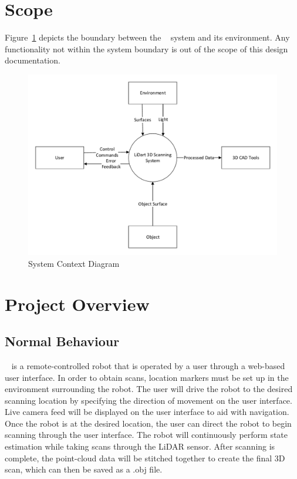 \documentclass[12pt, titlepage]{article}
\begin{document}

\section{Scope}
\label{sec_Scope}


Figure~\ref{Fig_SystemContext} depicts the boundary between the \progname~ system and its environment. Any functionality not within the system boundary is out of the scope of this design documentation.

\begin{figure}[H]
\begin{center}
 \includegraphics[width=1\textwidth]{Figures/Context Diagram.pdf}
\caption{System Context Diagram}
\label{Fig_SystemContext} 
\end{center}
\end{figure}

\section{Project Overview}
\label{sec_ProjOverview}

\subsection{Normal Behaviour}

\progname~ is a remote-controlled robot that is operated by a user through a web-based user interface. In order to obtain scans, location markers must be set up in the environment surrounding the robot. The user will drive the robot to the desired scanning location by specifying the direction of movement on the user interface. Live camera feed will be displayed on the user interface to aid with navigation. Once the robot is at the desired location, the user can direct the robot to begin scanning through the user interface. The robot will continuously perform state estimation while taking scans through the LiDAR sensor. After scanning is complete, the point-cloud data will be stitched together to create the final 3D scan, which can then be saved as a .obj file. \\
\end{document}

